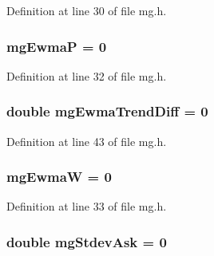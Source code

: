 Definition at line 30 of file mg.\+h.

\subsubsection[{\texorpdfstring{mg\+EwmaP}{mgEwmaP}}]{ mg\+EwmaP = 0}\hypertarget{class_k_1_1_m_g_ae990143af8448b62f44b2b2d7787eebc}{}\label{class_k_1_1_m_g_ae990143af8448b62f44b2b2d7787eebc}


Definition at line 32 of file mg.\+h.

\subsubsection[{\texorpdfstring{mg\+Ewma\+Trend\+Diff}{mgEwmaTrendDiff}}]{\setlength{\rightskip}{0pt plus 5cm}double mg\+Ewma\+Trend\+Diff = 0}\hypertarget{class_k_1_1_m_g_acd339134ddd47c67ddd7c3a8acdf7b3c}{}\label{class_k_1_1_m_g_acd339134ddd47c67ddd7c3a8acdf7b3c}


Definition at line 43 of file mg.\+h.

\subsubsection[{\texorpdfstring{mg\+EwmaW}{mgEwmaW}}]{ mg\+EwmaW = 0}\hypertarget{class_k_1_1_m_g_ad9e670e4f0b6caf6a5a8d8ee23acf178}{}\label{class_k_1_1_m_g_ad9e670e4f0b6caf6a5a8d8ee23acf178}


Definition at line 33 of file mg.\+h.

\subsubsection[{\texorpdfstring{mg\+Stdev\+Ask}{mgStdevAsk}}]{\setlength{\rightskip}{0pt plus 5cm}double mg\+Stdev\+Ask = 0}\hypertarget{class_k_1_1_m_g_a30c5f31a2b624ae505d3b371286a283b}{}\label{class_k_1_1_m_g_a30c5f31a2b624ae505d3b371286a283b}


